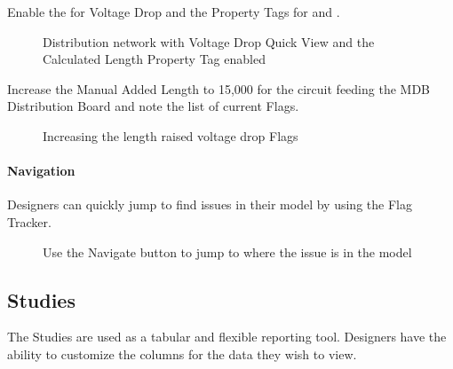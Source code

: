 \documentclass[letterpaper,10pt,english]{sphinxmanual}
\begin{document}
Enable the {\hyperref[\detokenize{docs/userguide/buildingelectricalmodel/one-line/index-one-line:property-tags}]{}} for Voltage Drop and the Property Tags for {\hyperref[\detokenize{docs/userguide/index-user_guide:calculated-length}]{}} and {\hyperref[\detokenize{docs/userguide/index-user_guide:manual-added-length}]{}}.

\begin{figure}[H]
\centering
\capstart

\noindent{}
\caption{Distribution network with Voltage Drop Quick View and the Calculated Length Property Tag enabled}\label{\detokenize{docs/userguide/buildingelectricalmodel/flagtracker/index-flag_tracker:id3}}\end{figure}

Increase the Manual Added Length to 15,000 for the circuit feeding the MDB Distribution Board and note the list of current Flags.

\begin{figure}[H]
\centering
\capstart

\noindent{}
\caption{Increasing the length raised voltage drop Flags}\label{\detokenize{docs/userguide/buildingelectricalmodel/flagtracker/index-flag_tracker:id4}}\end{figure}


\paragraph{Navigation}
\label{\detokenize{docs/userguide/buildingelectricalmodel/flagtracker/index-flag_tracker:navigation}}
Designers can quickly jump to find issues in their model by using the Flag Tracker.

\begin{figure}[H]
\centering
\capstart

\noindent{}
\caption{Use the Navigate button to jump to where the issue is in the model}\label{\detokenize{docs/userguide/buildingelectricalmodel/flagtracker/index-flag_tracker:id5}}\end{figure}


\subsection{Studies}
\label{\detokenize{docs/userguide/index-user_guide:studies}}\label{\detokenize{docs/userguide/buildingelectricalmodel/studies/index-studies:studies}}
The Studies are used as a tabular and flexible reporting tool.  Designers have the ability to customize the columns for the data they wish to view.
\end{document}
